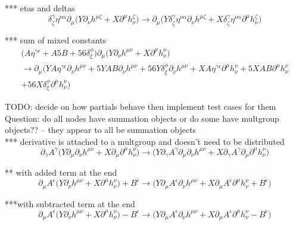 \documentclass{article}
\def\){\Big)}
\def\({\Big(}
\begin{document}
*** etas and deltas
\begin{equation}
\delta^{\gamma}_{\zeta} \eta^{\nu \alpha} \partial_{\mu} \(Y \partial_{\nu}h^{\mu \zeta} + X \partial^{\mu} h^{\zeta }_{\nu}\) \rightarrow
\partial_{\mu}\(Y \delta_{\zeta}^{\gamma} \eta^{\nu \alpha} \partial_{\nu}h^{\mu \zeta} +X \delta_{\zeta}^{\gamma} \eta^{\nu \alpha} \partial^{\mu}h_{\nu}^{\zeta} \)
\end{equation}

*** sum of mixed constants
\begin{multline}
\(A \eta^{\gamma \epsilon} + A5B + 56 \delta^{\phi}_{\xi} \) \partial_{\mu} \(Y \partial_{\nu}h^{\mu \nu} + X \partial^{\mu} h^{\nu }_{\nu}\)\\
 \rightarrow
\partial_{\mu} \(YA \eta^{\gamma \epsilon} \partial_{\nu} h^{\mu \nu} +5 YAB \partial_{\nu} h^{\mu \nu} +56 Y \delta_{\xi}^{\phi} \partial_{\nu} h^{\mu \nu} +XA \eta^{\gamma \epsilon} \partial^{\mu} h_{\nu}^{\nu} +5 XAB \partial^{\mu} h_{\nu}^{\nu} \\
+56 X \delta_{\xi}^{\phi} \partial^{\mu} h_{\nu}^{\nu} \)
\end{multline}

TODO: decide on how partials behave then implement test cases for them\\
Question: do all nodes have summation objects or do some have multgroup objects?? – they appear to all be summation objects\\
*** derivative is attached to a multgroup and doesn’t need to be distributed\\
\begin{equation}
 \partial_{\gamma}A^{\gamma}  \(Y \partial_{\mu}\partial_{\nu}h^{\mu \nu} + X \partial_{\mu}\partial^{\mu} h^{\nu }_{\nu}\)  \rightarrow \(Y \partial_{\gamma}A^{\gamma} \partial_{\mu}\partial_{\nu}h^{\mu \nu} +X \partial_{\gamma}A^{\gamma} \partial_{\mu}\partial^{\mu}h_{\nu}^{\nu} \)
\end{equation}

** with added term at the end
\begin{equation}
\partial_{\mu}   A^{\epsilon} \(Y \partial_{\nu}h^{\mu \nu} + X \partial^{\mu} h^{\nu }_{\nu}\) + B^{\epsilon} \rightarrow  \(Y \partial_{\mu}A^{\epsilon} \partial_{\nu}h^{\mu \nu} +X \partial_{\mu}A^{\epsilon} \partial^{\mu}h_{\nu}^{\nu} + B^{\epsilon} \)
\end{equation}


***with subtracted term at the end
\begin{equation}
\partial_{\mu}   A^{\epsilon} \(Y \partial_{\nu}h^{\mu \nu} + X \partial^{\mu} h^{\nu }_{\nu}\) - B^{\epsilon} \rightarrow  \(Y \partial_{\mu}A^{\epsilon} \partial_{\nu}h^{\mu \nu} +X \partial_{\mu}A^{\epsilon} \partial^{\mu}h_{\nu}^{\nu} - B^{\epsilon} \)
\end{equation}
\end{document}
